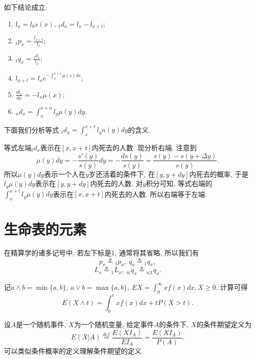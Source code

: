 \documentclass[lang=cn,10pt]{elegantbook}
\begin{document}
\begin{corollary} 如下结论成立:
	\begin{enumerate}
		\item $l_x=l_0s(x),\ {}_td_x=l_x-l_{x+t};$
		\item ${}_tp_x=\frac{l_{x+t}}{l_x};$
		\item ${}_tq_x=\frac{{}_td_x}{l_x};$
		\item $l_{x+t}=l_xe^{-\int_{x}^{x+t}\mu(s)ds};$
		\item $\frac{dl_x}{dx}=-l_x\mu(x);$
		\item $_nd_x=\int_{x}^{x+n}l_y\mu(y)dy.$
	\end{enumerate}
\end{corollary}

\begin{remark} 下面我们分析等式
	${}_td_x=\int_x^{x+t} l_yu(y)dy$的含义.
	
	等式左端${}_td_x$表示在$[x,x+t]$内死去的人数. 现分析右端. 注意到$$\mu(y)dy=-\dfrac{s'(y)}{s(y)}dy=-\dfrac{ds(y)}{s(y)}=\dfrac{s(y)-s(y+\Delta y)}{s(y)}.$$ 所以$\mu(y)dy$表示一个人在$y$岁还活着的条件下, 在$[y,y+dy]$内死去的概率, 于是$l_y\mu(y)dy$表示在$[y,y+dy]$内死去的人数. 对$y$积分可知, 等式右端的$\int_x^{x+t}l_y\mu(y)dy$表示在$[x,x+t]$内死去的人数. 所以右端等于左端.
\end{remark}

\section{生命表的元素}
\begin{proposition}
	在精算学的诸多记号中, 若左下标是1, 通常将其省略, 所以我们有
$${p_x}\triangleq{}_1p_x,~{q_x}\triangleq{}_1q_x,$$
$$L_x\triangleq{}_1L_x,~{}_{u|}q_x\triangleq{}_{u|1}q_x.$$
\end{proposition}

\begin{proposition}
	记$a\wedge b=\min\{a,b\},\ a\vee b=\max\{a,b\},\ EX=\int_0^{\infty}xf(x)dx,X\ge0.$ 计算可得
	\begin{equation*}
		E(X\wedge t) = \int_0^txf(x)dx+tP(X>t).
	\end{equation*}
\end{proposition}

\begin{definition}[条件数学期望]
	设$A$是一个随机事件, $X$为一个随机变量, 给定事件$A$的条件下, $X$的条件期望定义为
$$E(X|A)\overset{def}{=}\frac{E(XI_A)}{EI_A}=\frac{E(XI_A)}{P(A)}.$$
可以类似条件概率的定义理解条件期望的定义.
\end{definition}
\end{document}
